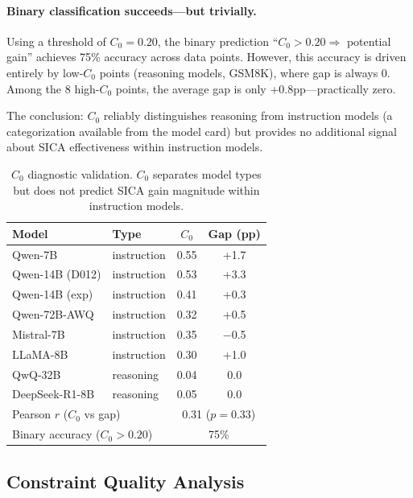 \documentclass[11pt,a4paper]{article}
\begin{document}
\paragraph{Binary classification succeeds---but trivially.}
Using a threshold of $C_0=0.20$, the binary prediction ``$C_0>0.20 \Rightarrow$ potential gain'' achieves 75\% accuracy across data points.
However, this accuracy is driven entirely by low-$C_0$ points (reasoning models, GSM8K), where gap is always 0.
Among the 8 high-$C_0$ points, the average gap is only +0.8pp---practically zero.

The conclusion: $C_0$ reliably distinguishes reasoning from instruction models (a categorization available from the model card) but provides no additional signal about SICA effectiveness within instruction models.

\begin{table}[t]
\centering
\small
\setlength{\tabcolsep}{3pt}
\begin{tabular}{llcc}
\toprule
\textbf{Model} & \textbf{Type} & $C_0$ & \textbf{Gap (pp)} \\
\midrule
Qwen-7B & instruction & 0.55 & +1.7 \\
Qwen-14B (D012) & instruction & 0.53 & +3.3 \\
Qwen-14B (exp) & instruction & 0.41 & +0.3 \\
Qwen-72B-AWQ & instruction & 0.32 & +0.5 \\
Mistral-7B & instruction & 0.35 & $-$0.5 \\
LLaMA-8B & instruction & 0.30 & +1.0 \\
\hdashline
QwQ-32B & reasoning & 0.04 & 0.0 \\
DeepSeek-R1-8B & reasoning & 0.05 & 0.0 \\
\midrule
\multicolumn{2}{l}{Pearson $r$ ($C_0$ vs gap)} & \multicolumn{2}{c}{0.31 ($p=0.33$)} \\
\multicolumn{2}{l}{Binary accuracy ($C_0>0.20$)} & \multicolumn{2}{c}{75\%} \\
\bottomrule
\end{tabular}
\caption{$C_0$ diagnostic validation. $C_0$ separates model types but does not predict SICA gain magnitude within instruction models.}
\label{tab:c0_diagnostic}
\end{table}

\subsection{Constraint Quality Analysis}
\label{sec:constraint_quality}
\end{document}
